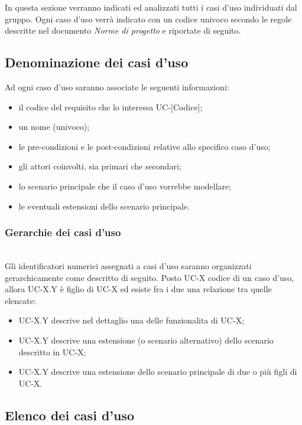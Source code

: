 In questa sezione verranno indicati ed analizzati tutti i casi d'uso individuati dal gruppo. Ogni caso d'uso verrà indicato con un codice univoco secondo le regole descritte nel documento \textit{Norme di progetto} e riportate di seguito. 
\subsection{Denominazione dei casi d'uso}
Ad ogni caso d'uso saranno associate le seguenti informazioni:
\begin{itemize}
\item il codice del requisito che lo interessa UC-[Codice];
\item un nome (univoco);
\item le pre-condizioni e le post-condizioni relative allo specifico caso d'uso;
\item gli attori coinvolti, sia primari che secondari;
\item lo scenario principale che il caso d'uso vorrebbe modellare;
\item le eventuali estensioni dello scenario principale.
\end{itemize}

\subsubsection{Gerarchie dei casi d'uso} 
\noindent \\
 Gli identificatori numerici assegnati a casi d'uso saranno organizzati gerarchicamente come descritto di seguito. Posto UC-X codice di un caso d'uso, allora UC-X.Y è figlio di UC-X ed esiste fra i due una relazione tra quelle elencate:
\begin{itemize}
\item UC-X.Y descrive nel dettaglio una delle funzionalita di UC-X;
\item UC-X.Y descrive una estensione (o scenario alternativo) dello scenario descritto in UC-X; 
\item UC-X.Y descrive una estensione dello scenario principale di due o più figli di UC-X.
\end{itemize}

\subsection{Elenco dei casi d'uso}
